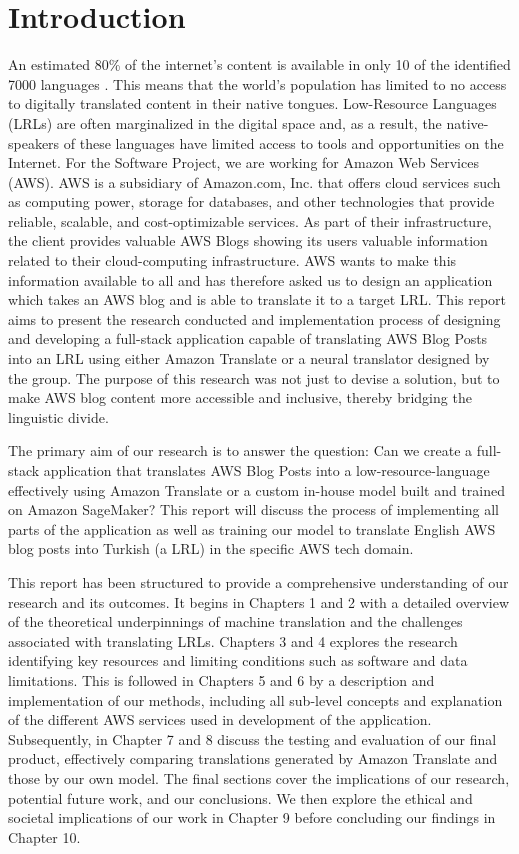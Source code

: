 \section{Introduction}
\indent \indent An estimated 80\% of the internet’s content is available in only 10 of the identified 7000 languages \cite{moseley2010}\cite{eberhard2021}. This means that the world's population has limited to no access to digitally translated content in their native tongues. Low-Resource Languages (LRLs) are often marginalized in the digital space and, as a result, the native-speakers of these languages have limited access to tools and opportunities on the Internet. For the Software Project, we are working for Amazon Web Services (AWS). AWS is a subsidiary of Amazon.com, Inc. that offers cloud services such as computing power, storage for databases, and other technologies that provide reliable, scalable, and cost-optimizable services. As part of their infrastructure, the client provides valuable AWS Blogs showing its users valuable information related to their cloud-computing infrastructure. AWS wants to make this information available to all and has therefore asked us to design an application which takes an AWS blog and is able to translate it to a target LRL. This report aims to present the research conducted and implementation process of designing and developing a full-stack application capable of translating AWS Blog Posts into an LRL using either Amazon Translate or a neural translator designed by the group. The purpose of this research was not just to devise a solution, but to make AWS blog content more accessible and inclusive, thereby bridging the linguistic divide.

\indent The primary aim of our research is to answer the question: Can we create a full-stack application that translates AWS Blog Posts into a low-resource-language effectively using Amazon Translate or a custom in-house model built and trained on Amazon SageMaker? This report will discuss the process of implementing all parts of the application as well as training our model to translate English AWS blog posts into Turkish (a LRL) in the specific AWS tech domain. 

\indent This report has been structured to provide a comprehensive understanding of our research and its outcomes. It begins in Chapters 1 and 2 with a detailed overview of the theoretical underpinnings of machine translation and the challenges associated with translating LRLs. Chapters 3 and 4 explores the research identifying key resources and limiting conditions such as software and data limitations. This is followed in Chapters 5 and 6 by a description and implementation of our methods, including all sub-level concepts and explanation of the different AWS services used in development of the application. Subsequently, in Chapter 7 and 8 discuss the testing and evaluation of our final product, effectively comparing translations generated by Amazon Translate and those by our own model. The final sections cover the implications of our research, potential future work, and our conclusions. We then explore the ethical and societal implications of our work in Chapter 9 before concluding our findings in Chapter 10.
